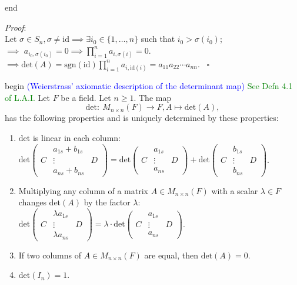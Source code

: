 \documentclass[
  12pt,
  a4paper,
  twoside]{article}
\theoremstyle{plain}
\theoremstyle{definition}
\begin{document}
\csname end

\emph{Proof}:\\
Let \(\sigma \in S_{n}, \sigma \neq \mathrm{id} \implies \exists i_{0} \in \{ 1, \ldots , n \}\) such that \(i_{0} > \sigma(i_{0})\);\\
\(\implies\) \(a_{i_{0}, \sigma(i_{0})} = 0 \implies \prod_{i=1}^{n} a_{i, \sigma(i)} = 0\).\\
\(\implies \mathrm{det}(A) = \mathrm{sgn}(\mathrm{id}) \prod_{i=1}^{n} a_{i, \mathrm{id}(i)} = a_{11} a_{22} \cdots a_{nn}\).
\hfill~{\(\square\)}

\csname begin\label{cnj:thm-weierstrass}
\textcolor{blue}{(Weierstrass' axiomatic description of the determinant map)}
\textcolor{green}{See Defn 4.1 of L.A.I.}
Let \(F\) be a field. Let \(n \geq 1\). The map
\[\mathrm{det}: \ M_{n \times n}(F) \rightarrow F, A \mapsto \mathrm{det}(A),\]
has the following properties and is uniquely determined by these properties:

\begin{enumerate}
\def\labelenumi{(\alph{enumi})}
\item
  \(\mathrm{det}\) is linear in each column:\\
  \(\mathrm{det} \begin{pmatrix} & a_{1s} + b_{1s} & \\ C & \vdots & D \\ & a_{ns} + b_{ns} & \end{pmatrix} = \mathrm{ det} \begin{pmatrix} & a_{1s} & \\ C & \vdots & D \\ & a_{ns} & \end{pmatrix} + \mathrm{det} \begin{pmatrix} & b_{1s} & \\ C & \vdots & D \\ & b_{ns} & \end{pmatrix}\).
\item
  Multiplying any column of a matrix \(A \in M_{n \times n}(F)\) with a scalar \(\lambda \in F\) changes \(\mathrm{det}(A)\) by the factor \(\lambda\):\\
  \(\mathrm{det} \begin{pmatrix} & \lambda a_{1s} & \\ C & \vdots & D \\ & \lambda a_{ns} & \end{pmatrix} = \lambda \cdot \mathrm{det} \begin{pmatrix} & a_{1s} & \\ C & \vdots & D \\ & a_{ns} & \end{pmatrix}\).
\item
  If two columns of \(A \in M_{n \times n}(F)\) are equal, then \(\mathrm{det}(A) = 0\).
\item
  \(\mathrm{det}(I_{n}) = 1\).
\end{enumerate}
\end{document}
